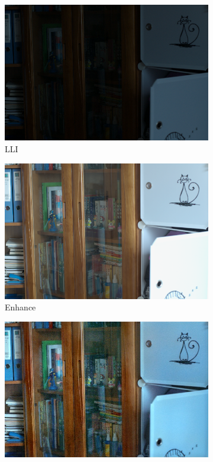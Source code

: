 \documentclass[a4paper, 10pt]{article}
\begin{document}
		\begin{figure}[htb]
			\centering
			\begin{subfigure}{0.19\textwidth}
				\includegraphics[width=\linewidth]{picture/LLIE/EnlightenGAN/low00001}
				\captionsetup{font=scriptsize}
				\caption{LLI}
				\label{fig: LLI}
			\end{subfigure}
			\begin{subfigure}{0.19\textwidth}
				\includegraphics[width=\linewidth]{picture/LLIE/EnlightenGAN/normal00001}
				\captionsetup{font=scriptsize}
				\caption{Enhance}
				\label{fig: Enhance}	
			\end{subfigure}
			\begin{subfigure}{0.19\textwidth}
				\includegraphics[width=\linewidth]{picture/LLIE/EnlightenGAN/processed_image}

\end{subfigure}
\end{figure}
\end{document}
